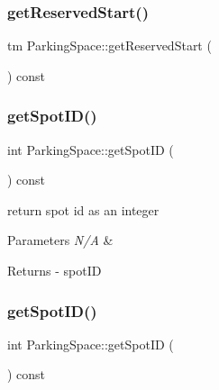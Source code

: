\subsubsection{\texorpdfstring{get\+Reserved\+Start()}{getReservedStart()}\hspace{0.1cm}{\footnotesize\ttfamily [2/2]}}
{\footnotesize\ttfamily tm Parking\+Space\+::get\+Reserved\+Start (\begin{DoxyParamCaption}{ }\end{DoxyParamCaption}) const}

\mbox{\label{class_parking_space_a8f250e7f0d01332b36c117b7c9ee0982}} 
\subsubsection{\texorpdfstring{get\+Spot\+I\+D()}{getSpotID()}\hspace{0.1cm}{\footnotesize\ttfamily [1/2]}}
{\footnotesize\ttfamily int Parking\+Space\+::get\+Spot\+ID (\begin{DoxyParamCaption}{ }\end{DoxyParamCaption}) const}



return spot id as an integer 


\begin{DoxyParams}{Parameters}
{\em N/A} & \\
\hline
\end{DoxyParams}
\begin{DoxyReturn}{Returns}
-\/ spot\+ID 
\end{DoxyReturn}
\mbox{\label{class_parking_space_a8f250e7f0d01332b36c117b7c9ee0982}} 
\subsubsection{\texorpdfstring{get\+Spot\+I\+D()}{getSpotID()}\hspace{0.1cm}{\footnotesize\ttfamily [2/2]}}
{\footnotesize\ttfamily int Parking\+Space\+::get\+Spot\+ID (\begin{DoxyParamCaption}{ }\end{DoxyParamCaption}) const}

